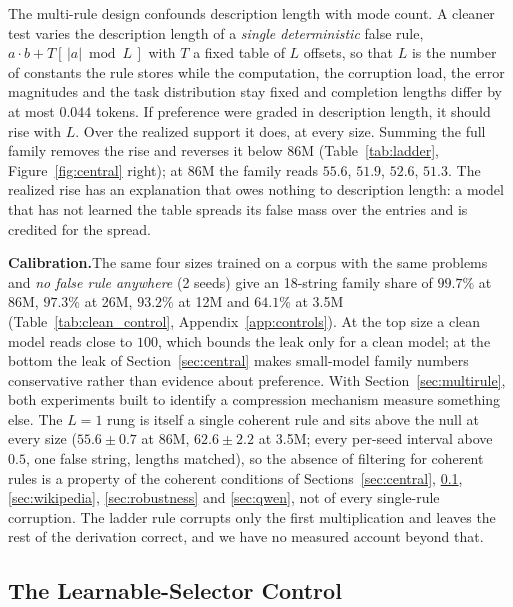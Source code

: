 \documentclass{article}
\begin{document}
The multi-rule design confounds description length with mode count. A cleaner test varies the description length of a \emph{single deterministic} false rule, $a \cdot b + T[\,|a| \bmod L\,]$ with $T$ a fixed table of $L$ offsets, so that $L$ is the number of constants the rule stores while the computation, the corruption load, the error magnitudes and the task distribution stay fixed and completion lengths differ by at most $0.044$ tokens. If preference were graded in description length, it should rise with $L$. Over the realized support it does, at every size. Summing the full family removes the rise and reverses it below 86M (Table~\ref{tab:ladder}, Figure~\ref{fig:central} right); at 86M the family reads $55.6$, $51.9$, $52.6$, $51.3$. The realized rise has an explanation that owes nothing to description length: a model that has not learned the table spreads its false mass over the entries and is credited for the spread.

\textbf{Calibration.}\quad The same four sizes trained on a corpus with the same problems and \emph{no false rule anywhere} (2 seeds) give an 18-string family share of $99.7\%$ at 86M, $97.3\%$ at 26M, $93.2\%$ at 12M and $64.1\%$ at 3.5M (Table~\ref{tab:clean_control}, Appendix~\ref{app:controls}). At the top size a clean model reads close to $100$, which bounds the leak only for a clean model; at the bottom the leak of Section~\ref{sec:central} makes small-model family numbers conservative rather than evidence about preference. With Section~\ref{sec:multirule}, both experiments built to identify a compression mechanism measure something else. The $L{=}1$ rung is itself a single coherent rule and sits above the null at every size ($55.6 \pm 0.7$ at 86M, $62.6 \pm 2.2$ at 3.5M; every per-seed interval above $0.5$, one false string, lengths matched), so the absence of filtering for coherent rules is a property of the coherent conditions of Sections~\ref{sec:central}, \ref{sec:learnable}, \ref{sec:wikipedia}, \ref{sec:robustness} and \ref{sec:qwen}, not of every single-rule corruption. The ladder rule corrupts only the first multiplication and leaves the rest of the derivation correct, and we have no measured account beyond that.

\subsection{The Learnable-Selector Control}
\label{sec:learnable}
\end{document}
